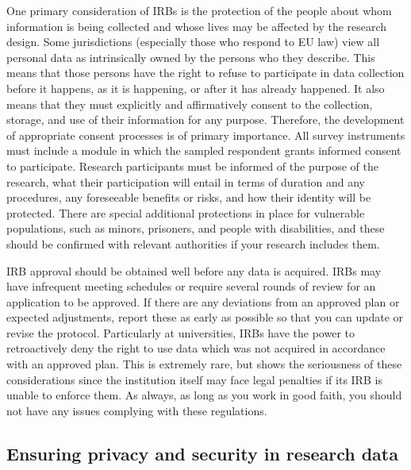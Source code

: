 One primary consideration of IRBs
is the protection of the people about whom information is being collected
and whose lives may be affected by the research design.
Some jurisdictions (especially those who respond to EU law) view all personal data
as intrinsically owned by the persons who they describe.
This means that those persons have the right to refuse to participate in data collection
before it happens, as it is happening, or after it has already happened.
It also means that they must explicitly and affirmatively consent
to the collection, storage, and use of their information for any purpose.
Therefore, the development of appropriate consent processes is of primary importance.
All survey instruments must include a module in which the sampled respondent grants informed consent to participate.
Research participants must be informed of the purpose of the research,
what their participation will entail in terms of duration and any procedures,
any foreseeable benefits or risks,
and how their identity will be protected.
There are special additional protections in place for vulnerable populations,
such as minors, prisoners, and people with disabilities,
and these should be confirmed with relevant authorities if your research includes them.

IRB approval should be obtained well before any data is acquired.
IRBs may have infrequent meeting schedules
or require several rounds of review for an application to be approved.
If there are any deviations from an approved plan or expected adjustments,
report these as early as possible so that you can update or revise the protocol.
Particularly at universities, IRBs have the power to retroactively deny
the right to use data which was not acquired in accordance with an approved plan.
This is extremely rare, but shows the seriousness of these considerations
since the institution itself may face legal penalties if its IRB
is unable to enforce them. As always, as long as you work in good faith,
you should not have any issues complying with these regulations.

\subsection{Ensuring privacy and security in research data}

